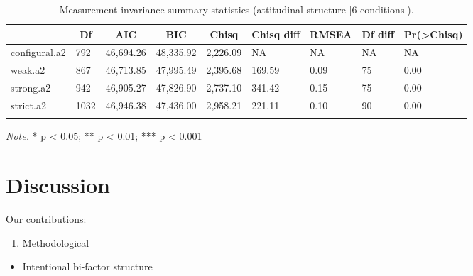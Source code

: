 \documentclass[
  man]{apa7}
\providecommand{\tightlist}{%
  \setlength{\itemsep}{0pt}\setlength{\parskip}{0pt}}
\begin{document}
\begin{table}[tbp]

\begin{center}
\begin{threeparttable}

\caption{\label{tab:measinv.siop2.att}Measurement invariance summary statistics (attitudinal structure [6 conditions]).}

\begin{tabular}{lllllllll}
\toprule
 & \multicolumn{1}{c}{Df} & \multicolumn{1}{c}{AIC} & \multicolumn{1}{c}{BIC} & \multicolumn{1}{c}{Chisq} & \multicolumn{1}{c}{Chisq diff} & \multicolumn{1}{c}{RMSEA} & \multicolumn{1}{c}{Df diff} & \multicolumn{1}{c}{Pr(>Chisq)}\\
\midrule
configural.a2 & 792 & 46,694.26 & 48,335.92 & 2,226.09 & NA & NA & NA & NA\\
weak.a2 & 867 & 46,713.85 & 47,995.49 & 2,395.68 & 169.59 & 0.09 & 75 & 0.00\\
strong.a2 & 942 & 46,905.27 & 47,826.90 & 2,737.10 & 341.42 & 0.15 & 75 & 0.00\\
strict.a2 & 1032 & 46,946.38 & 47,436.00 & 2,958.21 & 221.11 & 0.10 & 90 & 0.00\\
\bottomrule
\addlinespace
\end{tabular}

\begin{tablenotes}[para]
\normalsize{\textit{Note.} * p < 0.05; ** p < 0.01; *** p < 0.001}
\end{tablenotes}

\end{threeparttable}
\end{center}

\end{table}

\hypertarget{discussion}{%
\section{Discussion}\label{discussion}}

Our contributions:

\begin{enumerate}
\def\labelenumi{\arabic{enumi}.}
\tightlist
\item
  Methodological
\end{enumerate}

\begin{itemize}
\tightlist
\item
  Intentional bi-factor structure
\end{itemize}
\end{document}
